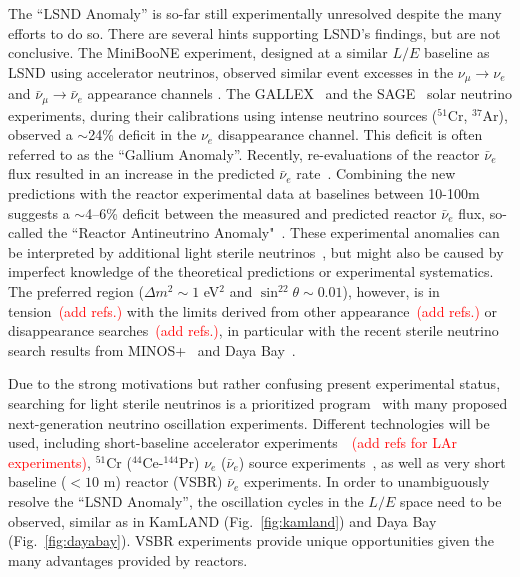 The ``LSND Anomaly'' is so-far still experimentally unresolved despite the many efforts to do so. 
There are several hints supporting LSND's findings, but are not conclusive.
The MiniBooNE experiment, designed at a similar $L/E$ baseline as LSND using accelerator neutrinos, observed similar event excesses in the $\nu_{\mu}\rightarrow\nu_e$ and $\bar\nu_{\mu}\rightarrow\bar\nu_e$ appearance channels \cite{MiniBooNE2013}. 
The GALLEX~\cite{GALLEX2010} and the SAGE~\cite{SAGE2009} solar neutrino experiments, during their calibrations using intense neutrino sources ($^{51}$Cr, $^{37}$Ar), observed a $\sim$24\% deficit in the $\nu_e$ disappearance channel. 
This deficit is often referred to as the ``Gallium Anomaly''. 
Recently, re-evaluations of the reactor $\bar\nu_e$ flux resulted in an increase in the predicted $\bar\nu_e$ rate~\cite{Mueller, Huber}. 
Combining the new predictions with the reactor experimental data at baselines between 10-100m suggests a $\sim$4--6\% deficit between the measured and predicted reactor $\bar\nu_e$ flux, so-called the ``Reactor Antineutrino Anomaly"~\cite{Mention2011,Zhang13}. 
These experimental anomalies can be interpreted by additional light sterile neutrinos~\cite{Guinti2011}, but might also be caused by imperfect knowledge of the theoretical predictions or experimental systematics.  
The preferred region ($\Delta{m}^2\sim1$ eV$^2$ and $\sin^22\theta\sim0.01$), however, is in tension~\textcolor{red}{(add refs.)} with the limits derived from other appearance~\textcolor{red}{(add refs.)} or disappearance searches~\textcolor{red}{(add refs.)}, in particular with the recent sterile neutrino search results from MINOS+~\cite{Sousa-Neutrino14} and Daya Bay~\cite{DayaBaySterile}.

Due to the strong motivations but rather confusing present experimental status, searching for light sterile neutrinos is a prioritized program~\cite{sterileWP} with many proposed next-generation neutrino oscillation experiments.
Different technologies will be used, including short-baseline accelerator experiments~\cite{nuSTORM,IsoDAR}~\textcolor{red}{(add refs for LAr experiments)}, $^{51}$Cr ($^{44}$Ce-$^{144}$Pr) $\nu_e$ ($\bar\nu_e$) source experiments~\cite{Cribier2011,Dwyer2013,SOX,CeLAND}, as well as very short baseline ($<10$ m) reactor (VSBR) $\bar\nu_e$ experiments. 
In order to unambiguously resolve the ``LSND Anomaly'', the oscillation cycles in the $L/E$ space need to be observed, similar as in KamLAND (Fig.~\ref{fig:kamland}) and Daya Bay (Fig.~\ref{fig:dayabay}). VSBR experiments provide unique opportunities given the many advantages provided by reactors.

